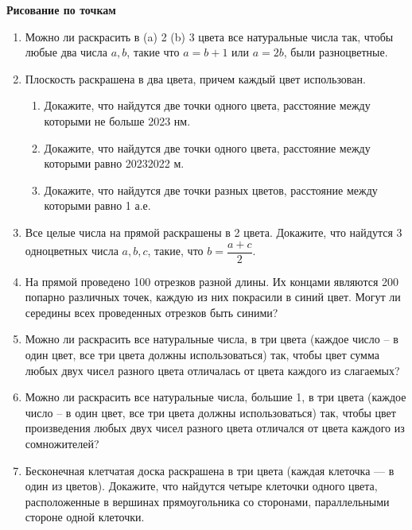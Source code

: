 \documentclass{article}
\begin{document}
\large
	
\begin{center}
	\textbf{Рисование по точкам}
\end{center}


\begin{enumerate}[label*=\protect\fbox{\arabic{enumi}}]
	
\item Можно ли раскрасить в (a) 2 (b) 3 цвета все натуральные числа так, чтобы любые два числа $a, b$, такие что $a = b + 1$ или $a = 2b$, были разноцветные.

\item Плоскость раскрашена в два цвета, причем каждый цвет использован. 
\begin{enumerate}
\item Докажите, что найдутся две точки одного цвета, расстояние между которыми не больше 2023 нм.
	
\item Докажите, что найдутся две точки одного цвета, расстояние между которыми равно 20232022 м.

\item Докажите, что найдутся две точки разных цветов, расстояние между которыми равно 1 а.е.
\end{enumerate}

\item Все целые числа на прямой раскрашены в 2 цвета. Докажите, что найдутся 3 одноцветных числа $a, b, c$, такие, что $b = \dfrac{a + c}{2}$.

\item На прямой проведено 100 отрезков разной длины. Их концами являются 200 попарно различных точек, каждую из них покрасили в синий цвет. Могут ли середины всех проведенных отрезков быть синими?

\item Можно ли раскрасить все натуральные числа, в три цвета (каждое число – в один цвет, все три цвета должны использоваться) так, чтобы цвет сумма любых двух чисел разного цвета отличалась от цвета каждого из слагаемых?

\item Можно ли раскрасить все натуральные числа, большие 1, в три цвета (каждое число – в один цвет, все три цвета должны использоваться) так, чтобы цвет произведения любых двух чисел разного цвета отличался от цвета каждого из сомножителей?

\item Бесконечная клетчатая доска раскрашена в три цвета (каждая клеточка — в один из цветов). Докажите, что найдутся четыре клеточки одного цвета, расположенные в вершинах прямоугольника со сторонами, параллельными стороне одной клеточки. 

\end{enumerate}
\end{document}
